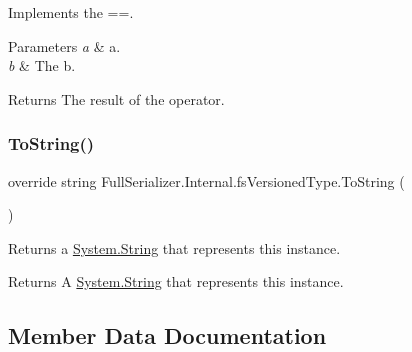 Implements the ==. 


\begin{DoxyParams}{Parameters}
{\em a} & a.\\
\hline
{\em b} & The b.\\
\hline
\end{DoxyParams}
\begin{DoxyReturn}{Returns}
The result of the operator.
\end{DoxyReturn}
\mbox{\label{struct_full_serializer_1_1_internal_1_1fs_versioned_type_a00a4df4bd28d37f0ce3eba8d478cfb0c}} 
\subsubsection{\texorpdfstring{To\+String()}{ToString()}}
{\footnotesize\ttfamily override string Full\+Serializer.\+Internal.\+fs\+Versioned\+Type.\+To\+String (\begin{DoxyParamCaption}{ }\end{DoxyParamCaption})\hspace{0.3cm}{\ttfamily [inline]}}



Returns a \hyperlink{namespace_full_serializer_a6eee33d63b94e40fdfcfc59af9fcfc82a27118326006d3829667a400ad23d5d98}{System.\+String} that represents this instance. 

\begin{DoxyReturn}{Returns}
A \hyperlink{namespace_full_serializer_a6eee33d63b94e40fdfcfc59af9fcfc82a27118326006d3829667a400ad23d5d98}{System.\+String} that represents this instance.
\end{DoxyReturn}


\subsection{Member Data Documentation}
\mbox{\label{struct_full_serializer_1_1_internal_1_1fs_versioned_type_a39df96581297b4b9d9fbadfdeeaea33d}} 
